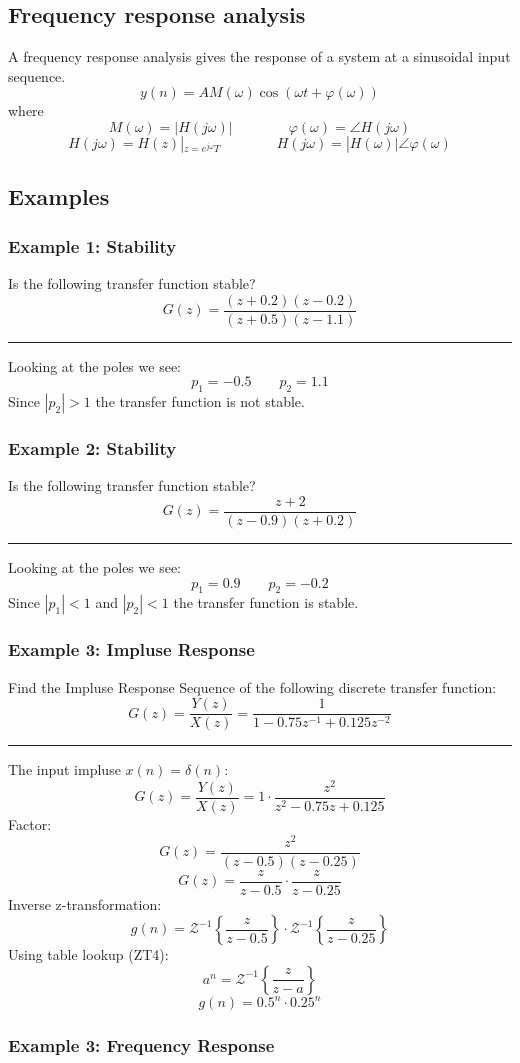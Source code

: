 \subsection{Frequency response analysis}
A frequency response analysis gives the response of a system at a sinusoidal input sequence.
$$y(n)=AM(\omega)\cos(\omega t+\varphi(\omega))$$
where
$$M(\omega)=|H(j\omega)| \qquad \qquad\varphi(\omega)=\angle H(j\omega)$$
$$H(j\omega)=H(z)|_{z=e^{j\omega}T}\qquad\qquad H(j\omega)=|H(\omega)|\angle\varphi(\omega)$$

\subsection{Examples}
\subsubsection{Example 1: Stability}
Is the following transfer function stable?
$$G(z)=\frac{(z+0.2)(z-0.2)}{(z+0.5)(z-1.1)}$$

\rule{\textwidth}{0.5pt}

Looking at the poles we see:
$$p_1=-0.5\qquad p_2=1.1$$
Since $|p_2|> 1$ the transfer function is not stable.
\subsubsection{Example 2: Stability}
Is the following transfer function stable?
$$G(z)=\frac{z+2}{(z-0.9)(z+0.2)}$$

\rule{\textwidth}{0.5pt}

Looking at the poles we see:
$$p_1=0.9\qquad p_2=-0.2$$
Since $|p_1|< 1$ and $|p_2|< 1$ the transfer function is stable.

\subsubsection{Example 3: Impluse Response}
Find the Impluse Response Sequence of the following discrete transfer function:
$$G(z)=\frac{Y(z)}{X(z)}=\frac{1}{1-0.75z^{-1}+0.125z^{-2}}$$

\rule{\textwidth}{0.5pt}

The input impluse $x(n)=\delta(n)$:
$$G(z)=\frac{Y(z)}{X(z)}=1\cdot\frac{z^2}{z^2-0.75z+0.125}$$
Factor:
$$G(z)=\frac{z^2}{(z-0.5)(z-0.25)}$$
$$G(z)=\frac{z}{z-0.5}\cdot\frac{z}{z-0.25}$$
Inverse z-transformation:
$$g(n)=\mathcal{Z}^{-1}\left\{\frac{z}{z-0.5}\right\}\cdot\mathcal{Z}^{-1}\left\{\frac{z}{z-0.25}\right\}$$
Using table lookup (ZT4):
$$a^n=\mathcal{Z}^{-1}\left\{\frac{z}{z-a}\right\}$$
$$g(n)=0.5^n\cdot 0.25^n$$

\subsubsection{Example 3: Frequency Response}
